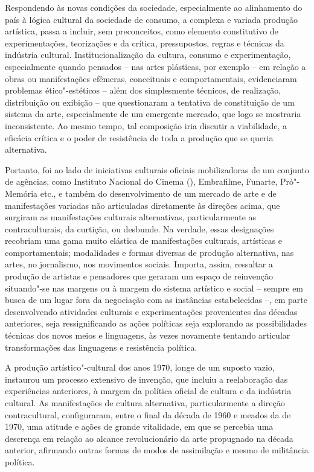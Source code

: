 Respondendo às novas condições da sociedade, especialmente ao
alinhamento do país à lógica cultural da sociedade de consumo, a
complexa e variada produção artística, passa a incluir, sem
preconceitos, como elemento constitutivo de experimentações, teorizações
e da crítica, pressupostos, regras e técnicas da indústria cultural.
Institucionalização da cultura, consumo e experimentação, especialmente
quando pensados -- nas artes plásticas, por exemplo -- em relação a
obras ou manifestações efêmeras, conceituais e comportamentais,
evidenciaram problemas ético"-estéticos -- além dos simplesmente
técnicos, de realização, distribuição ou exibição -- que questionaram a
tentativa de constituição de um sistema da arte, especialmente de um
emergente mercado, que logo se mostraria inconsistente. Ao mesmo tempo,
tal composição iria discutir a viabilidade, a eficácia crítica e o poder
de resistência de toda a produção que se queria alternativa.

Portanto, foi ao lado de iniciativas culturais oficiais mobilizadoras de
um conjunto de agências, como Instituto Nacional do Cinema (),
Embrafilme, Funarte, Pró"-Memória etc., e também do desenvolvimento de um
mercado de arte e de manifestações variadas não articuladas diretamente
às direções acima, que surgiram as manifestações culturais
alternativas, particularmente as contraculturais, da curtição, ou
desbunde. Na verdade, essas designações recobriam uma gama muito
elástica de manifestações culturais, artísticas e comportamentais;
modalidades e formas diversas de produção alternativa, nas artes, no
jornalismo, nos movimentos sociais. Importa, assim, ressaltar a produção
de artistas e pensadores que geraram um espaço de reinvenção situando"-se
nas margens ou à margem do sistema artístico e social -- sempre em busca
de um lugar fora da negociação com as instâncias estabelecidas --, em parte
desenvolvendo atividades culturais e experimentações provenientes
das décadas anteriores, seja ressignificando as ações
políticas seja explorando as possibilidades técnicas dos novos meios e
linguagens, às vezes novamente tentando articular transformações das
linguagens e resistência política.

A produção artístico"-cultural dos anos 1970, longe de um suposto vazio,
instaurou um processo extensivo de invenção, que incluiu a reelaboração
das experiências anteriores, à margem da política oficial de cultura e
da indústria cultural. As manifestações de cultura alternativa,
particularmente a direção contracultural, configuraram, entre o final da
década de 1960 e meados da de 1970, uma atitude e ações de grande
vitalidade, em que se percebia uma descrença em relação ao alcance
revolucionário da arte propugnado na década anterior, afirmando outras
formas de modos de assimilação e mesmo de militância política.

